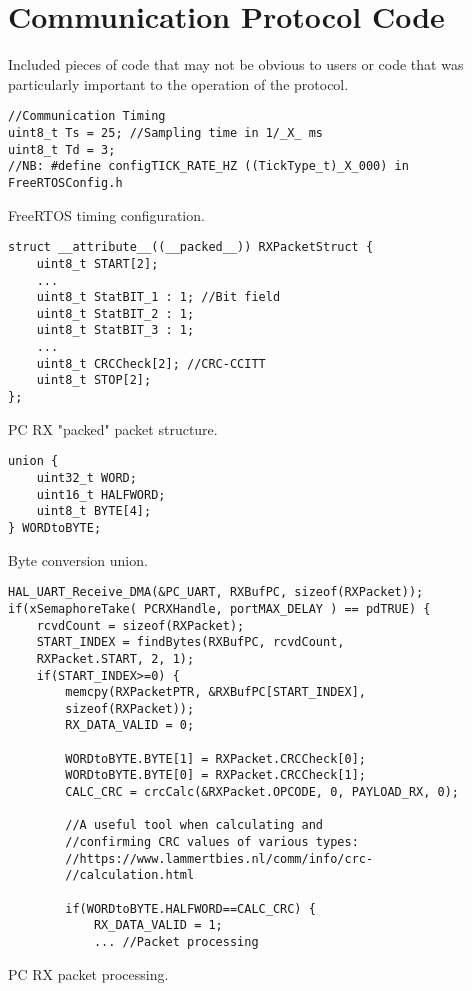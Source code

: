 \chapter{Communication Protocol Code}
\label{app:Code}
Included pieces of code that may not be obvious to users or code that was particularly important to the operation of the protocol.


\begin{listing}[ht]
\begin{verbatim}
//Communication Timing
uint8_t Ts = 25; //Sampling time in 1/_X_ ms
uint8_t Td = 3;
//NB: #define configTICK_RATE_HZ ((TickType_t)_X_000) in FreeRTOSConfig.h
\end{verbatim}
\caption{FreeRTOS timing configuration.}
\label{listing:FreeRTOS timing}
\end{listing}

\begin{listing}[ht]
\begin{verbatim}
struct __attribute__((__packed__)) RXPacketStruct {
	uint8_t START[2];
	...
	uint8_t StatBIT_1 : 1; //Bit field
	uint8_t StatBIT_2 : 1;
	uint8_t StatBIT_3 : 1;
	...
	uint8_t CRCCheck[2]; //CRC-CCITT        
	uint8_t STOP[2];
};
\end{verbatim}
\caption{PC RX "packed" packet structure.}
\label{listing:packet-packet}
\end{listing}

\begin{listing}[ht]
\begin{verbatim}
union {
	uint32_t WORD;
	uint16_t HALFWORD;
	uint8_t BYTE[4];
} WORDtoBYTE;
\end{verbatim}
\caption{Byte conversion union.}
\label{listing:Byte conversion union}
\end{listing}

\begin{listing}[ht]
\begin{verbatim}
HAL_UART_Receive_DMA(&PC_UART, RXBufPC, sizeof(RXPacket));
if(xSemaphoreTake( PCRXHandle, portMAX_DELAY ) == pdTRUE) {
	rcvdCount = sizeof(RXPacket);
	START_INDEX = findBytes(RXBufPC, rcvdCount, 
	RXPacket.START, 2, 1);
	if(START_INDEX>=0) {
		memcpy(RXPacketPTR, &RXBufPC[START_INDEX], 		
		sizeof(RXPacket));
		RX_DATA_VALID = 0;

		WORDtoBYTE.BYTE[1] = RXPacket.CRCCheck[0];
		WORDtoBYTE.BYTE[0] = RXPacket.CRCCheck[1];
		CALC_CRC = crcCalc(&RXPacket.OPCODE, 0, PAYLOAD_RX, 0);
		
		//A useful tool when calculating and 
		//confirming CRC values of various types: 
		//https://www.lammertbies.nl/comm/info/crc-		
		//calculation.html

		if(WORDtoBYTE.HALFWORD==CALC_CRC) {
			RX_DATA_VALID = 1;
			... //Packet processing
\end{verbatim}
\caption{PC RX packet processing.}
\label{listing:PC RX packet processing}
\end{listing}

